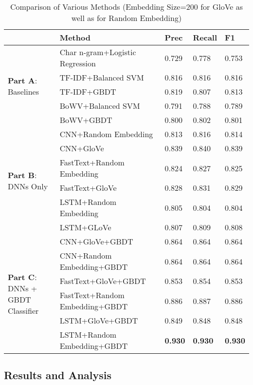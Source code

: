\documentclass[letterpaper]{sig-alternate-2013}
\begin{document}
\setlength{\tabcolsep}{0.15pc}
\begin{table}
	\scriptsize
	\caption{\scriptsize Comparison of Various Methods (Embedding Size=200 for GloVe as well as for Random Embedding)}
	\vspace{-0.6pc}
	\label{tab:experiments}
	\begin{tabular}{|p{1.05cm}|p{4.9cm}|l|p{0.7cm}|p{0.7cm}|}
		\hline
		&Method & Prec & Recall& F1\\
		\hline
		\multirow{5}{*}{\parbox{1.05cm}{\textbf{Part A}:\\ Baselines}}  &  Char n-gram+Logistic Regression~\cite{waseem2016hateful} & 0.729 & 0.778 & 0.753\\
		&		TF-IDF+Balanced SVM &	0.816 	&0.816 &0.816\\
		&		TF-IDF+GBDT &0.819&	0.807&	0.813\\
		&   BoWV+Balanced SVM& 0.791 & 0.788 & 0.789\\
		&		BoWV+GBDT& 0.800 & 0.802 & 0.801\\
		\hline
		\multirow{6}{*}{\parbox{1.05cm}{\textbf{Part B}:\\ DNNs Only}}  &    CNN+Random Embedding& 0.813& 0.816&0.814\\
		&    CNN+GloVe&0.839&0.840&0.839\\
		&    FastText+Random Embedding& 0.824& 0.827 & 0.825 \\
		&    FastText+GloVe& 0.828 & 0.831& 0.829\\
		&    LSTM+Random Embedding& 0.805& 0.804& 0.804\\
		&    LSTM+GLoVe& 0.807 & 0.809& 0.808\\
		\hline
		\multirow{6}{*}{\parbox{1.05cm}{\textbf{Part C}:\\ DNNs + GBDT Classifier}}  &		CNN+GloVe+GBDT&	0.864	&0.864&	0.864\\
		&CNN+Random Embedding+GBDT&0.864&0.864&0.864\\
		&FastText+GloVe+GBDT &0.853&0.854&0.853\\
		&FastText+Random Embedding+GBDT &0.886&0.887&0.886\\ 
		&LSTM+GloVe+GBDT& 0.849&0.848&0.848\\
		&LSTM+Random Embedding+GBDT&	\textbf{0.930}	&\textbf{0.930}&	\textbf{0.930}\\
		\hline
	\end{tabular}
\end{table}


\subsection{Results and Analysis}
\end{document}

